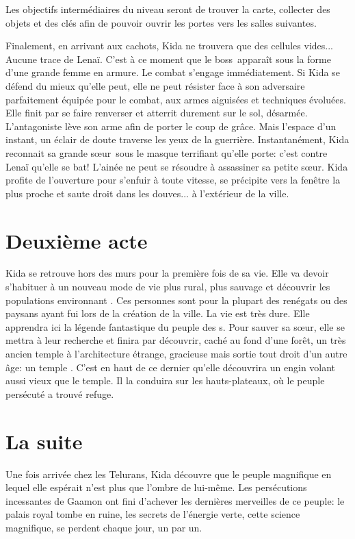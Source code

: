 Les objectifs intermédiaires du niveau seront de trouver la carte, collecter des objets et des clés afin de pouvoir ouvrir les portes vers les salles suivantes.

Finalement, en arrivant aux cachots, Kida ne trouvera que des cellules vides... Aucune trace de Lenaï. C'est à ce moment que le boss\ apparaît sous la forme d'une grande femme en armure. Le combat s'engage immédiatement. Si Kida se défend du mieux qu'elle peut, elle ne peut résister face à son adversaire parfaitement équipée pour le combat, aux armes aiguisées et techniques évoluées. Elle finit par se faire renverser et atterrit durement sur le sol, désarmée. L'antagoniste lève son arme afin de porter le coup de grâce. Mais l'espace d'un instant, un éclair de doute traverse les yeux de la guerrière. Instantanément, Kida reconnait sa grande s\oe ur\ sous le masque terrifiant qu'elle porte: c'est contre Lenaï qu'elle se bat! L'ainée ne peut se résoudre à assassiner sa petite s\oe ur. Kida profite de l'ouverture pour s'enfuir à toute vitesse, se précipite vers la fenêtre la plus proche et saute droit dans les douves... à l'extérieur de la ville.


\section{Deuxième acte}
\label{sec:deuxiemeActe}
Kida se retrouve hors des murs pour la première fois de sa vie. Elle va devoir s'habituer à un nouveau mode de vie plus rural, plus sauvage et découvrir les populations environnant \nomVille. Ces personnes sont pour la plupart des renégats ou des paysans ayant fui lors de la création de la ville. La vie est très dure. Elle apprendra ici la légende fantastique du peuple des \nomNaturels s. Pour sauver sa s\oe ur, elle se mettra à leur recherche et finira par découvrir, caché au fond d'une forêt, un très ancien temple à l'architecture étrange, gracieuse mais sortie tout droit d'un autre âge: un temple \nomNaturels. C'est en haut de ce dernier qu'elle découvrira un engin volant aussi vieux que le temple. Il la conduira sur les hauts-plateaux, où le peuple persécuté a trouvé refuge.

\section{La suite}
Une fois arrivée chez les Telurans, Kida découvre que le peuple magnifique en lequel elle espérait n'est plus que l'ombre de lui-même. Les persécutions incessantes de Gaamon ont fini d'achever les dernières merveilles de ce peuple: le palais royal tombe en ruine, les secrets de l'énergie verte, cette science magnifique, se perdent chaque jour, un par un. 

